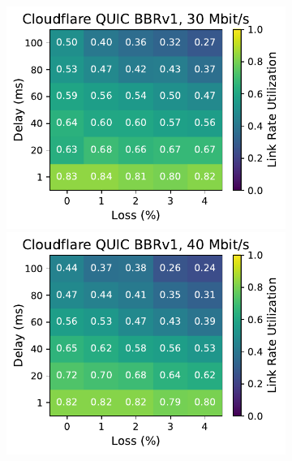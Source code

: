 \begin{figure}[ht]
\begin{subfigure}[b]{0.22\linewidth}
        \includegraphics[width=\linewidth,trim={0 0 2cm 0},clip]{splitting-paper/figures/heatmaps/heatmap_quiche_bbr1_30mbps.pdf}
        \includegraphics[width=\linewidth,trim={0 0 2cm 0},clip]{splitting-paper/figures/heatmaps/heatmap_quiche_bbr1_40mbps.pdf}

\end{subfigure}
\end{figure}
